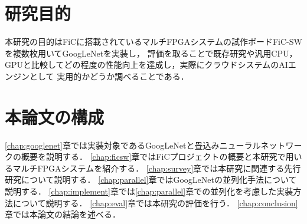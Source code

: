 {  \section{研究目的}
  \label{sec:purpose}
  本研究の目的はFiCに搭載されているマルチFPGAシステムの試作ボードFiC-SWを複数枚用いてGoogLeNetを実装し，
  評価を取ることで既存研究や汎用CPU，GPUと比較してどの程度の性能向上を達成し，実際にクラウドシステムのAIエンジンとして
  実用的かどうか調べることである．

  \section{本論文の構成}
  \label{sec:composition}
  \ref{chap:googlenet}章では実装対象であるGoogLeNetと畳込みニューラルネットワークの概要を説明する．
  \ref{chap:ficsw}章ではFiCプロジェクトの概要と本研究で用いるマルチFPGAシステムを紹介する．
  \ref{chap:survey}章では本研究に関連する先行研究について説明する．
  \ref{chap:parallel}章ではGoogLeNetの並列化手法について説明する．
  \ref{chap:implement}章では\ref{chap:parallel}章での並列化を考慮した実装方法について説明する． 
  \ref{chap:eval}章では本研究の評価を行う． 
  \ref{chap:conclusion}章では本論文の結論を述べる．
}
